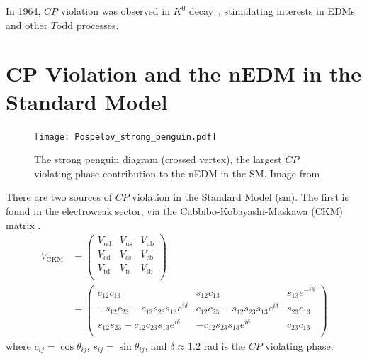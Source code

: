 In 1964, $CP$ violation was observed in $K^0$ decay~\cite{christenson_1964}, stimulating interests in EDMs and other $T$\textendash odd processes.


\section{CP Violation and the nEDM in the Standard Model}\label{sec:CP_violation_SM}


\begin{figure}[htp]
    \centering
    \texttt{[image: Pospelov\_strong\_penguin.pdf]}
    \caption[The strong penguin diagram, the largest $CP$ violating phase contribution to the nEDM in the SM]
    {The strong penguin diagram (crossed vertex), the largest $CP$ violating phase contribution to the nEDM in the SM. Image from \cite{pospelov_electric_2005}}
    \label{fig:strong_penguin}
\end{figure}

There are two sources of $CP$ violation in the Standard Model (\acrshort*{sm}). The first is found in the electroweak sector, via the Cabbibo-Kobayashi-Maskawa (CKM) matrix \cite{ckm1973, ChauKeung1984, pdg2022}.
%
\begin{align}
    V_\text{CKM} &= \left( \begin{matrix}
    V_\text{ud} & V_\text{us} & V_\text{ub} \\
    V_\text{cd} & V_\text{cs} & V_\text{cb} \\
    V_\text{td} & V_\text{ts} & V_\text{tb} \\
    \end{matrix} \right) \\
    &= \left( \begin{matrix}
    c_{12}c_{13} & s_{12}c_{13} & s_{13}e^{-i\delta} \\
    -s_{12}c_{23}-c_{12}s_{23}s_{13}e^{i\delta} & c_{12}c_{23}-s_{12}s_{23}s_{13}e^{i\delta} & s_{23}c_{13} \\
    s_{12}s_{23}-c_{12}c_{23}s_{13}e^{i\delta} & -c_{12}s_{23}s_{13}e^{i\delta} & c_{23}c_{13} \\
    \end{matrix} \right)
\end{align}
%
where $c_{ij}=\cos\theta_{ij}$, $s_{ij}=\sin\theta_{ij}$, and $\delta\approx1.2\text{ rad}$ is the $CP$ violating phase.

